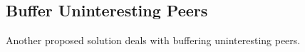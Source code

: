 \subsection{Buffer Uninteresting Peers}

Another proposed solution deals with buffering uninteresting peers.
